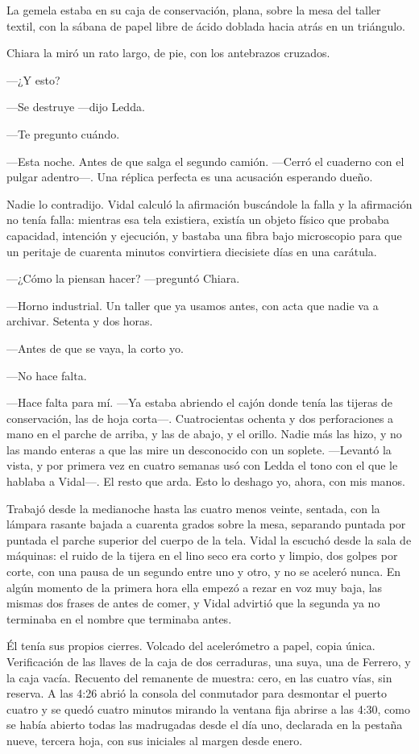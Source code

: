 La gemela estaba en su caja de conservación, plana, sobre la mesa del taller textil, con la sábana de papel libre de ácido doblada hacia atrás en un triángulo.

Chiara la miró un rato largo, de pie, con los antebrazos cruzados.

---¿Y esto?

---Se destruye ---dijo Ledda.

---Te pregunto cuándo.

---Esta noche. Antes de que salga el segundo camión. ---Cerró el cuaderno con el pulgar adentro---. Una réplica perfecta es una acusación esperando dueño.

Nadie lo contradijo. Vidal calculó la afirmación buscándole la falla y la afirmación no tenía falla: mientras esa tela existiera, existía un objeto físico que probaba capacidad, intención y ejecución, y bastaba una fibra bajo microscopio para que un peritaje de cuarenta minutos convirtiera diecisiete días en una carátula.

---¿Cómo la piensan hacer? ---preguntó Chiara.

---Horno industrial. Un taller que ya usamos antes, con acta que nadie va a archivar. Setenta y dos horas.

---Antes de que se vaya, la corto yo.

---No hace falta.

---Hace falta para mí. ---Ya estaba abriendo el cajón donde tenía las tijeras de conservación, las de hoja corta---. Cuatrocientas ochenta y dos perforaciones a mano en el parche de arriba, y las de abajo, y el orillo. Nadie más las hizo, y no las mando enteras a que las mire un desconocido con un soplete. ---Levantó la vista, y por primera vez en cuatro semanas usó con Ledda el tono con el que le hablaba a Vidal---. El resto que arda. Esto lo deshago yo, ahora, con mis manos.

Trabajó desde la medianoche hasta las cuatro menos veinte, sentada, con la lámpara rasante bajada a cuarenta grados sobre la mesa, separando puntada por puntada el parche superior del cuerpo de la tela. Vidal la escuchó desde la sala de máquinas: el ruido de la tijera en el lino seco era corto y limpio, dos golpes por corte, con una pausa de un segundo entre uno y otro, y no se aceleró nunca. En algún momento de la primera hora ella empezó a rezar en voz muy baja, las mismas dos frases de antes de comer, y Vidal advirtió que la segunda ya no terminaba en el nombre que terminaba antes.

Él tenía sus propios cierres. Volcado del acelerómetro a papel, copia única. Verificación de las llaves de la caja de dos cerraduras, una suya, una de Ferrero, y la caja vacía. Recuento del remanente de muestra: cero, en las cuatro vías, sin reserva. A las 4:26 abrió la consola del conmutador para desmontar el puerto cuatro y se quedó cuatro minutos mirando la ventana fija abrirse a las 4:30, como se había abierto todas las madrugadas desde el día uno, declarada en la pestaña nueve, tercera hoja, con sus iniciales al margen desde enero.

